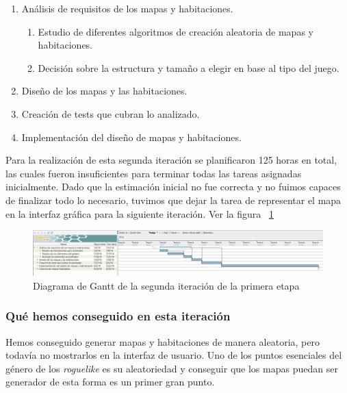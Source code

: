 \begin{enumerate}[label=\bfseries WBS 2.\arabic*]
  \item Análisis de requisitos de los mapas y habitaciones.
    \begin{enumerate}[label=\bfseries WBS 2.1.\arabic*]
      \item Estudio de diferentes algoritmos de creación aleatoria de mapas y habitaciones.
      \item Decisión sobre la estructura y tamaño a elegir en base al tipo del juego.
    \end{enumerate}
  \item Diseño de los mapas y las habitaciones.
  \item Creación de tests que cubran lo analizado.
  \item Implementación del diseño de mapas y habitaciones.
\end{enumerate}

Para la realización de esta segunda iteración se planificaron 125 horas en total, las cuales fueron insuficientes para terminar todas las tareas asignadas inicialmente. Dado que la estimación inicial no fue correcta y no fuimos capaces de finalizar todo lo necesario, tuvimos que dejar la tarea de representar el mapa en la interfaz gráfica para la siguiente iteración. Ver la figura ~\ref{fig:sec1it2}

\begin{figure}
    \includegraphics[width=\textwidth,height=\textheight,keepaspectratio]{./img/sec1it2.png}
  \caption{Diagrama de Gantt de la segunda iteración de la primera etapa}
  \label{fig:sec1it2}
\end{figure}

\subsubsection{Qué hemos conseguido en esta iteración}

Hemos conseguido generar mapas y habitaciones de manera aleatoria, pero todavía no mostrarlos en la interfaz de usuario. Uno de los puntos esenciales del género de los \textit{roguelike} es su aleatoriedad y conseguir que los mapas puedan ser generador de esta forma es un primer gran punto.

